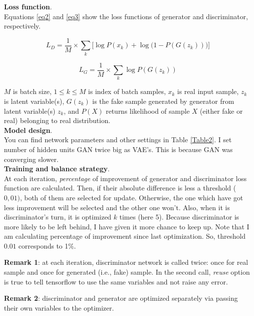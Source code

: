 

\textbf{Loss function}.\\ Equations \ref{eq2} and \ref{eq3} show the loss functions of generator and discriminator, respectively.


\begin{equation}\tag{2}
L_D =  \frac{1}{M} \times \sum_{k} \bigg[ \log P(x_k) + \log \big(1- P(G({z_k}))\big)  \bigg] 
\label{eq2}
\end{equation}

\begin{equation}\tag{3}
L_G =  \frac{1}{M} \times \sum_{k}  \log P(G({z_k}))
\label{eq3} 
\end{equation}

$M$ is batch size, $1 \leqslant k \leqslant M$ is index of batch samples, $x_k$ is real input sample, $z_k$ is latent variable(s), $G(z_k)$ is the fake sample generated by generator from latent variable(s) $z_k$, and $P(X)$ returns likelihood of sample $X$ (either fake or real) belonging to real distribution. \\

\textbf{Model design}.\\
You can find network parameters and other settings in Table \ref{Table2}. I set number of hidden units GAN twice big as VAE's. This is because GAN was converging slower.\\

\textbf{Training and balance strategy}. \\ 
At each iteration, \textit{percentage} of improvement of generator and discriminator loss function are calculated. Then, if their absolute difference is less a threshold ($0,01)$, both of them are selected for update. Otherwise, the one which have got less improvement will be selected and the other one won't. Also, when it is discriminator’s turn, it is optimized $k$ times (here 5). Because discriminator is more likely to be left behind, I have given it more chance to keep up. Note that I am calculating percentage of improvement since last optimization. So, threshold $0.01$ corresponds to 1\%.  

\textbf{Remark 1}: at each iteration, discriminator network is called twice: once for real sample and once for generated (i.e., fake) sample. In the second call, \textit{reuse} option is true to tell tensorflow to use the same variables and not raise any error. 

\textbf{Remark 2}: discriminator and generator are optimized separately via passing their own variables to the optimizer. 
\\ 

